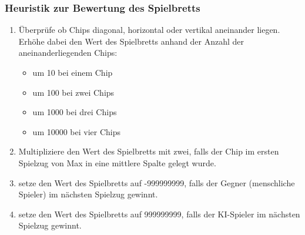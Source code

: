 
\begin{frame}
\frametitle{Heuristik zur Bewertung des Spielbretts}

\begin{enumerate}
	\item Überprüfe ob Chips diagonal, horizontal oder vertikal aneinander liegen. Erhöhe dabei den Wert des Spielbretts anhand der Anzahl der aneinanderliegenden Chips:
	\begin{itemize}
		\item um 10 bei einem Chip
		\item um 100 bei zwei Chips
		\item um 1000 bei drei Chips
		\item um 10000 bei vier Chips
	\end{itemize}
	\item Multipliziere den Wert des Spielbretts mit zwei, falls der Chip im ersten Spielzug von Max in eine mittlere Spalte gelegt wurde.
	\item setze den Wert des Spielbretts auf -999999999, falls der Gegner (menschliche Spieler) im nächsten Spielzug gewinnt.
	\item setze den Wert des Spielbretts auf 999999999, falls der KI-Spieler im nächsten Spielzug gewinnt.
\end{enumerate}
\end{frame}



